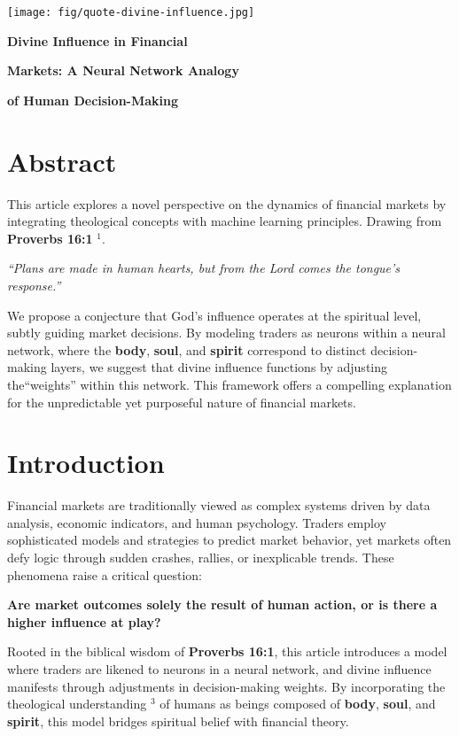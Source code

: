 \documentclass{article}
\newcommand{\bn}{\bigskip\noindent}
\newcommand{\mn}{\medskip\noindent}
\begin{document}
\begin{center}
\texttt{[image: fig/quote-divine-influence.jpg]}
\end{center}

\mn
{\huge\bf Divine Influence in Financial}

\bn
{\huge\bf  Markets: A Neural Network Analogy}

\mn
{\huge\bf   of Human Decision-Making}


\bn
\section*{Abstract}

\bn
This article explores a novel perspective on the dynamics of financial markets by integrating theological concepts with machine learning principles. Drawing from {\bf Proverbs 16:1} $^1$.


\mn
\emph{``Plans are made in human hearts, but from the Lord comes the tongue's response.''}


\mn
We propose a conjecture that God's influence operates at the spiritual level, subtly guiding market decisions. By modeling traders as neurons within a neural network, where the {\bf body}, {\bf soul}, and {\bf spirit} correspond to distinct decision-making layers, we suggest that divine influence functions by adjusting the``weights'' within this network. This framework offers a compelling explanation for the unpredictable yet purposeful nature of financial markets.


\bn
\section{Introduction}

Financial markets are traditionally viewed as complex systems driven by data analysis, economic indicators, and human psychology. Traders employ sophisticated models and strategies to predict market behavior, yet markets often defy logic through sudden crashes, rallies, or inexplicable trends. These phenomena raise a critical question: 

\bn
{\bf Are market outcomes solely the result of human action, or is there a higher influence at play?}

\bn
Rooted in the biblical wisdom of {\bf Proverbs 16:1}, this article introduces a model where traders are likened to neurons in a neural network, and divine influence manifests through adjustments in decision-making weights. By incorporating the theological understanding $^3$ of humans as beings composed of {\bf body}, {\bf soul}, and {\bf spirit}, this model bridges spiritual belief with financial theory.
\end{document}
